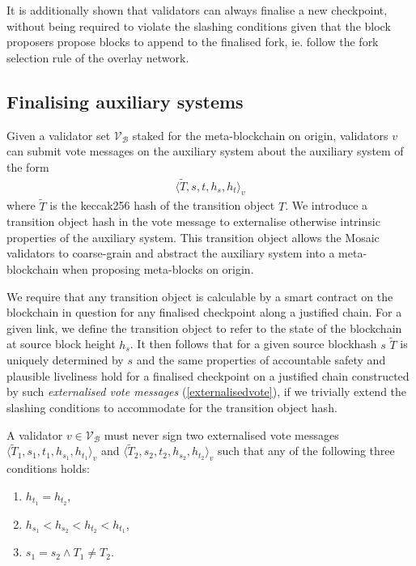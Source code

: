 \documentclass[12pt,a4paper]{article}
\begin{document}
It is additionally shown that validators can always finalise a new checkpoint, without being required to violate the slashing conditions given that the block proposers propose blocks to append to the finalised fork, ie. follow the fork selection rule of the overlay network.

\subsection{Finalising auxiliary systems}
Given a validator set $\mathcal{V}_\mathcal{B}$ staked for the meta-blockchain on origin, validators $v$ can submit vote messages on the auxiliary system about the auxiliary system of the form
\begin{align}\label{externalisedvote}
  \langle \tilde{T}, s, t, h_s, h_t \rangle_v
\end{align}
where $\tilde{T}$ is the keccak256 hash of the transition object $T$. We introduce a transition object hash in the vote message to externalise otherwise intrinsic properties of the auxiliary system. This transition object allows the Mosaic validators to coarse-grain and abstract the auxiliary system into a meta-blockchain when proposing meta-blocks on origin.

We require that any transition object is calculable by a smart contract on the blockchain in question for any finalised checkpoint along a justified chain. For a given link, we define the transition object to refer to the state of the blockchain at source block height $h_s$. It then follows that for a given source blockhash $s$ $\tilde{T}$ is uniquely determined by $s$ and the same properties of accountable safety and plausible liveliness hold for a finalised checkpoint on a justified chain constructed by such \emph{externalised vote messages} (\ref{externalisedvote}), if we trivially extend the slashing conditions to accommodate for the transition object hash.

A validator $v \in \mathcal{V}_\mathcal{B}$ must never sign two externalised vote messages $\langle \tilde{T}_1, s_1, t_1, h_{s_1}, h_{t_1}\rangle_v$ and $\langle \tilde{T}_2, s_2, t_2, h_{s_2}, h_{t_2}\rangle_v$ such that any of the following three conditions holds:
\begin{enumerate}
  \item $h_{t_1} = h_{t_2}$,
  \item $h_{s_1} < h_{s_2} < h_{t_2} < h_{t_1}$,
  \item $s_1 = s_2 \land T_1 \neq T_2$.
\end{enumerate}
\end{document}
